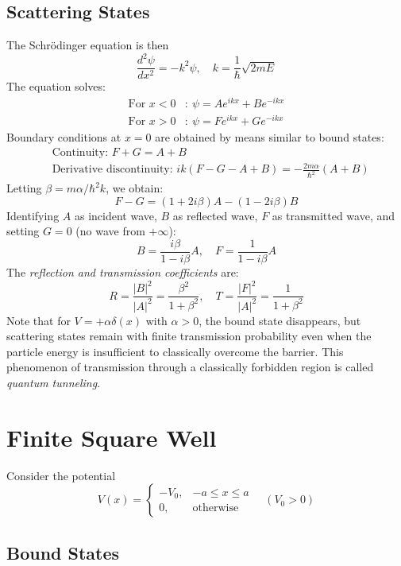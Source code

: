 \subsection{Scattering States}

The Schrödinger equation is then
\[
\frac{d^2\psi}{dx^2} = -k^2\psi, \quad
k = \frac{1}{\hbar}\sqrt{2mE}
\]
The equation solves:
\[\begin{aligned}
\text{For } x < 0&:\ \psi = Ae^{ikx} + Be^{-ikx} \\
\text{For } x > 0&:\ \psi = Fe^{ikx} + Ge^{-ikx}
\end{aligned}\]
Boundary conditions at $x = 0$ are obtained by means similar to bound states:
\begin{align*}
&\text{Continuity: } F + G = A + B \\
&\text{Derivative discontinuity: } ik(F - G - A + B) = -\frac{2m\alpha}{\hbar^2}(A + B)
\end{align*}
Letting $\beta = m\alpha/\hbar^2 k$, we obtain:
\[
F - G = (1 + 2i\beta)A - (1 - 2i\beta)B
\]
Identifying $A$ as incident wave, $B$ as reflected wave, $F$ as transmitted wave, and setting $G = 0$ (no wave from $+\infty$):
\[
B = \frac{i\beta}{1 - i\beta}A, \quad F = \frac{1}{1 - i\beta}A
\]
The \emph{reflection and transmission coefficients} are:
\[
R = \frac{|B|^2}{|A|^2} = \frac{\beta^2}{1 + \beta^2}, \quad T = \frac{|F|^2}{|A|^2} = \frac{1}{1 + \beta^2}
\]
Note that for $V = +\alpha\delta(x)$ with $\alpha > 0$, the bound state disappears, but scattering states remain with finite transmission probability even when the particle energy is insufficient to classically overcome the barrier. This phenomenon of transmission through a classically forbidden region is called \emph{quantum tunneling}.

\section{Finite Square Well}

Consider the potential
\[
V(x) = \begin{cases} -V_0, & -a \leq x \leq a \\ 0, & \text{otherwise} \end{cases} \quad (V_0 > 0)
\]

\subsection{Bound States}

